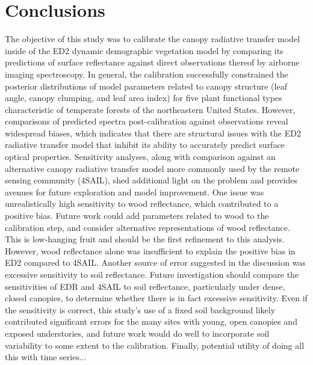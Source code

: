 \section{Conclusions}

The objective of this study was to calibrate the canopy radiative transfer model inside of the ED2 dynamic demographic vegetation model by comparing its predictions of surface reflectance against direct observations thereof by airborne imaging spectroscopy.
In general, the calibration successfully constrained the posterior distributions of model parameters related to canopy structure (leaf angle, canopy clumping, and leaf area index) for five plant functional types characteristic of temperate forests of the northeastern United States.  
However, comparisons of predicted spectra post-calibration against observations reveal widespread biases, which indicates that there are structural issues with the ED2 radiative transfer model that inhibit its ability to accurately predict surface optical properties.
Sensitivity analyses, along with comparison against an alternative canopy radiative transfer model more commonly used by the remote sensing community (4SAIL), shed additional light on the problem and provides avenues for future exploration and model improvement.
One issue was unrealistically high sensitivity to wood reflectance, which contributed to a positive bias.
Future work could add parameters related to wood to the calibration step, and consider alternative representations of wood reflectance.
This is low-hanging fruit and should be the first refinement to this analysis.
However, wood reflectance alone was insufficient to explain the positive bias in ED2 compared to 4SAIL.
Another source of error suggested in the discussion was excessive sensitivity to soil reflectance.
Future investigation should compare the sensitivities of EDR and 4SAIL to soil reflectance, particularly under dense, closed canopies, to determine whether there is in fact excessive sensitivity.
Even if the sensitivity is correct, this study's use of a fixed soil background likely contributed significant errors for the many sites with young, open canopies and exposed understories, and future work would do well to incorporate soil variability to some extent to the calibration.
Finally, potential utility of doing all this with time series...
